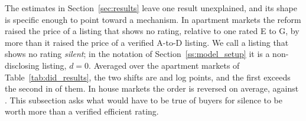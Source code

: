 The estimates in Section~\ref{sec:results} leave one result unexplained, and its shape is specific enough to point toward a mechanism. In apartment markets the reform raised the price of a listing that shows no rating, relative to one rated E to G, by more than it raised the price of a verified A-to-D listing. We call a listing that shows no rating \emph{silent}; in the notation of Section~\ref{ss:model_setup} it is a non-disclosing listing, $d=0$. Averaged over the \attNMarketsApt{} apartment markets of Table~\ref{tab:did_results}, the two shifts are \attDthreeApt{} and \attBthreeApt{} log points, and the first exceeds the second in \attNDgtBApt{} of them. In house markets the order is reversed on average, \attDthreeHouse{} against \attBthreeHouse{}. This subsection asks what would have to be true of buyers for silence to be worth more than a verified efficient rating.
